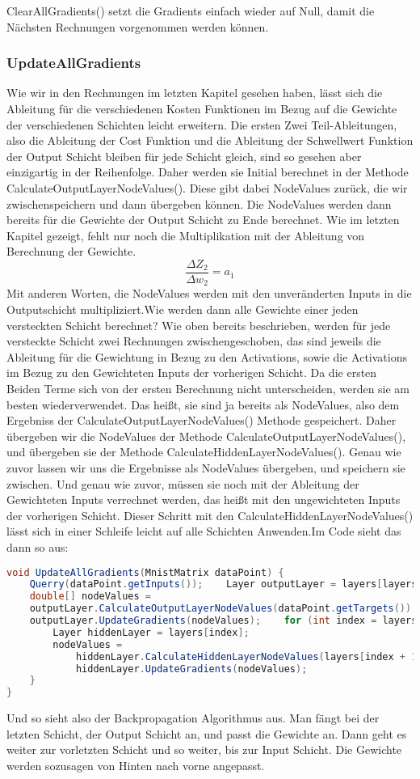 \documentclass[12pt]{article}
\begin{document}
ClearAllGradients() setzt die Gradients einfach wieder auf Null, damit die Nächsten Rechnungen vorgenommen werden können.\subsubsection{ UpdateAllGradients}Wie wir in den Rechnungen im letzten Kapitel gesehen haben, lässt sich die Ableitung für die verschiedenen Kosten Funktionen im Bezug auf die Gewichte der verschiedenen Schichten leicht erweitern. Die ersten Zwei Teil-Ableitungen, also die Ableitung der Cost Funktion und die Ableitung der Schwellwert Funktion der Output Schicht bleiben für jede Schicht gleich, sind so gesehen aber einzigartig in der Reihenfolge. Daher werden sie Initial berechnet in der Methode CalculateOutputLayerNodeValues(). Diese gibt dabei NodeValues zurück, die wir zwischenspeichern und dann übergeben können. Die NodeValues werden dann bereits für die Gewichte der Output Schicht zu Ende berechnet. Wie im letzten Kapitel gezeigt, fehlt nur noch die Multiplikation mit der Ableitung von Berechnung der Gewichte. 
$$\frac{\Delta Z_2}{\Delta w_2}=a_1$$
Mit anderen Worten, die NodeValues werden mit den unveränderten Inputs in die Outputschicht multipliziert.Wie werden dann alle Gewichte einer jeden versteckten Schicht berechnet? 
Wie oben bereits beschrieben, werden für jede versteckte Schicht zwei Rechnungen zwischengeschoben, das sind jeweils die Ableitung für die Gewichtung in Bezug zu den Activations, sowie die Activations im Bezug zu den Gewichteten Inputs der vorherigen Schicht. Da die ersten Beiden Terme sich von der ersten Berechnung nicht unterscheiden, werden sie am besten wiederverwendet. Das heißt, sie sind ja bereits als NodeValues, also dem Ergebniss der CalculateOutputLayerNodeValues() Methode gespeichert. Daher übergeben wir die NodeValues der Methode CalculateOutputLayerNodeValues(), und übergeben sie der Methode CalculateHiddenLayerNodeValues(). Genau wie zuvor lassen wir uns die Ergebnisse als NodeValues übergeben, und speichern sie zwischen. Und genau wie zuvor, müssen sie noch mit der Ableitung der Gewichteten Inputs verrechnet werden, das heißt mit den ungewichteten Inputs der vorherigen Schicht.
Dieser Schritt mit den CalculateHiddenLayerNodeValues() lässt sich in einer Schleife leicht auf alle Schichten Anwenden.Im Code sieht das dann so aus:\begin{lstlisting}[language=Java]
void UpdateAllGradients(MnistMatrix dataPoint) {
    Querry(dataPoint.getInputs());    Layer outputLayer = layers[layers.length - 1];
    double[] nodeValues = 
    outputLayer.CalculateOutputLayerNodeValues(dataPoint.getTargets());
    outputLayer.UpdateGradients(nodeValues);    for (int index = layers.length - 2; index >= 0; index--) {
        Layer hiddenLayer = layers[index];
        nodeValues = 
            hiddenLayer.CalculateHiddenLayerNodeValues(layers[index + 1], nodeValues);
            hiddenLayer.UpdateGradients(nodeValues);
    }
}
\end{lstlisting}Und so sieht also der Backpropagation Algorithmus aus. Man fängt bei der letzten Schicht, der Output Schicht an, und passt die Gewichte an. Dann geht es weiter zur vorletzten Schicht und so weiter, bis zur Input Schicht. Die Gewichte werden sozusagen von Hinten nach vorne angepasst.
\end{document}
